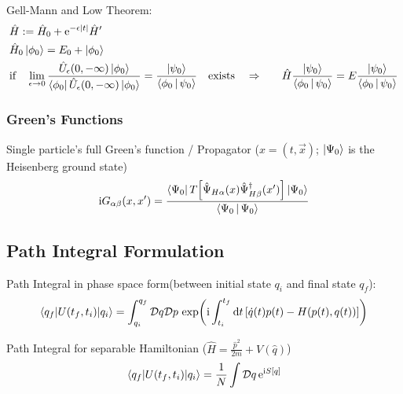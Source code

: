 		\noindent
		Gell-Mann and Low Theorem:
		\begin{equation}
			\begin{aligned}
				&\hat{H} := \hat{H}_0 + \mathrm{e}^{-\epsilon \abs{t}} \hat{H}' \\
				&\hat{H}_0 \Ket{\phi_0} = E_0 + \Ket{\phi_0} \\
				&\text{if}\quad \lim_{\epsilon\rightarrow 0} \frac{\hat{U}_\epsilon(0,-\infty)\Ket{\phi_0}}{\Bra{\phi_0} \hat{U}_\epsilon(0,-\infty)\Ket{\phi_0}}
				= \frac{\Ket{\psi_0}}{\Braket{\phi_0|\psi_0}} \quad\text{exists}\quad
				\Rightarrow&\quad \hat{H} \frac{\Ket{\psi_0}}{\Braket{\phi_0|\psi_0}} = E \frac{\Ket{\psi_0}}{\Braket{\phi_0|\psi_0}} \\
			\end{aligned}
		\end{equation}

		\subsubsection{Green's Functions}
			Single particle's full Green's function / Propagator  ($x=(t,\vec{x})$; $\Ket{\Psi_0}$ is the Heisenberg ground state)
			\begin{equation}
				\begin{aligned}
					\mathrm{i} G_{\alpha\beta}(x, x') &= \frac{\Bra{\Psi_0} T\qty[\hat{\Psi}_{H\alpha}(x)\hat{\Psi}^\dagger_{H\beta}(x')] \Ket{\Psi_0}}{\Braket{\Psi_0|\Psi_0}} \\					
				\end{aligned}
			\end{equation}


	\subsection{Path Integral Formulation}
		Path Integral in phase space form(between initial state $q_i$ and final state $q_f$):
		\begin{equation}
			\mel**{q_f}{U(t_f, t_i)}{q_i} = \int_{q_i}^{q_f} \mathcal{D}q \mathcal{D}p \, \exp(\mathrm{i} \int_{t_i}^{t_f} \dd t \, \qty[ \dot{q}(t)p(t) - H\qty(p(t),q(t))])
		\end{equation}
		
		\noindent
		Path Integral for separable Hamiltonian (\ie $\hat{H} = \frac{\hat{p}^2}{2m} + V(\hat{q})$)
		\begin{equation}
			\mel**{q_f}{U(t_f, t_i)}{q_i} = \frac{1}{N} \int \mathcal{D}q \, \mathrm{e}^{\mathrm{i} S[q]}
		\end{equation}
		
